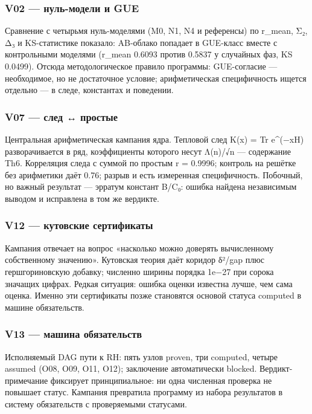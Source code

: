 \documentclass[11pt,a4paper]{article}
\begin{document}
\subsubsection{V02 — нуль-модели и GUE}

Сравнение с четырьмя нуль-моделями (M0, N1, N4 и референсы) по r\_mean, Σ₂, Δ₃ и KS-статистике показало: AB-облако попадает в GUE-класс вместе с контрольными моделями (r\_mean 0.6093 против 0.5837 у случайных фаз, KS 0.0499). Отсюда методологическое правило программы: GUE-согласие — необходимое, но не достаточное условие; арифметическая специфичность ищется отдельно — в следе, константах и поведении.

\subsubsection{V07 — след ↔ простые}

Центральная арифметическая кампания ядра. Тепловой след K(x) = Tr e\textasciicircum{}(−xH) разворачивается в ряд, коэффициенты которого несут Λ(n)/√n — содержание Th6. Корреляция следа с суммой по простым r = 0.9996; контроль на решётке без арифметики даёт 0.76; разрыв и есть измеренная специфичность. Побочный, но важный результат — эрратум констант B/C₀: ошибка найдена независимым выводом и исправлена в том же вердикте.

\subsubsection{V12 — кутовские сертификаты}

Кампания отвечает на вопрос «насколько можно доверять вычисленному собственному значению». Кутовская теория даёт коридор δ²/gap плюс гершгориновскую добавку; численно ширины порядка 1e−27 при сорока значащих цифрах. Редкая ситуация: ошибка оценки известна лучше, чем сама оценка. Именно эти сертификаты позже становятся основой статуса computed в машине обязательств.

\subsubsection{V13 — машина обязательств}

Исполняемый DAG пути к RH: пять узлов proven, три computed, четыре assumed (O08, O09, O11, O12); заключение автоматически blocked. Вердикт-примечание фиксирует принципиальное: ни одна численная проверка не повышает статус. Кампания превратила программу из набора результатов в систему обязательств с проверяемыми статусами.
\end{document}
